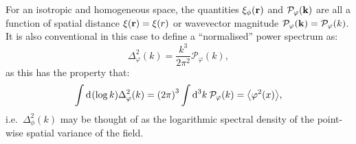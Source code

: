 For an isotropic and homogeneous space, the quantities $\xi_\phi(\vr)$ and $\mathcal{P}_\varphi(\vk)$ are all a function of spatial distance ${\xi(\vr) = \xi(r)}$ or wavevector magnitude ${\mathcal{P}_\varphi(\vk) = \mathcal{P}_\varphi(k)}$.
It is also conventional in this case to define a ``normalised'' power spectrum as:
\begin{equation}
  \Delta_\varphi^2(k) = \frac{k^3}{2\pi^2} \mathcal{P}_\varphi(k),
\end{equation}
as this has the property that:
\begin{equation}
  \int \d{(\log k)} \Delta_\varphi^2(k) = {\left( 2\pi \right)}^3\int\d[3]{k}\: \mathcal{P}_\varphi(k) = \mean{\varphi^2(x)},
\end{equation}
i.e.\ $\Delta_\phi^2(k)$ may be thought of as the logarithmic spectral density of the point-wise spatial variance of the field.


